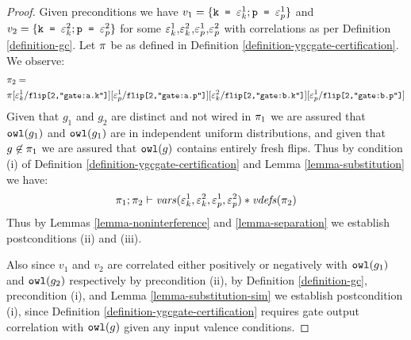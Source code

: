 \begin{proof}
  Given preconditions we have $v_1 =  \{ \texttt{k = }\varepsilon^1_{k}; \texttt{p = }\varepsilon^1_{p} \}$ and
  $v_2 = \{ \texttt{k = }\varepsilon^2_{k}; \texttt{p = }\varepsilon^2_{p} \}$ for some
  $\varepsilon^1_{k}$,$\varepsilon^2_{k}$,$\varepsilon^1_{p}$,$\varepsilon^2_{p}$ with correlations as per Definition
  \ref{definition-gc}.
  Let $\pi$ be as defined in Definition \ref{definition-ygcgate-certification}.
  We observe:
  \begin{eqnarray*}
    &\pi_2 = \\
    &{\small \pi[\varepsilon^1_{k}/\texttt{flip[2,"gate:a.k"]}][\varepsilon^1_{p}/\texttt{flip[2,"gate:a.p"]}][\varepsilon^2_{k}/\texttt{flip[2,"gate:b.k"]}][\varepsilon^1_{p}/\texttt{flip[2,"gate:b.p"]}]}
  \end{eqnarray*}
  Given that $g_1$ and $g_2$ are distinct and not wired in $\pi_1$
  we are assured that $\texttt{owl}(g_1)$ and $\texttt{owl}(g_1)$ are in
  independent uniform distributions, and given that $g \not\in
  \pi_1$ we are assured that $\texttt{owl}(g)$ contains entirely fresh
  flips. Thus by condition (i) of Definition \ref{definition-ygcgate-certification} and
  Lemma \ref{lemma-substitution} we have:
  $$
  \pi_1;\pi_2 \vdash \mathit{vars}(\varepsilon^1_{k},\varepsilon^2_{k},\varepsilon^1_{p},\varepsilon^2_{p}) * \mathit{vdefs}(\pi_2)
  $$
  Thus by Lemmas \ref{lemma-noninterference} and \ref{lemma-separation} we establish
  postconditions (ii) and (iii).

  Also since $v_1$ and $v_2$ are correlated either positively or negatively with
  $\texttt{owl}(g_1)$ and $\texttt{owl}(g_2)$ respectively by precondition (ii),
  by Definition \ref{definition-gc}, precondition (i), and Lemma \ref{lemma-substitution-sim}
  we establish postcondition (i), since Definition \ref{definition-ygcgate-certification}
  requires gate output correlation with $\texttt{owl}(g)$ given any input valence conditions.
\end{proof}

\ygcencode*

